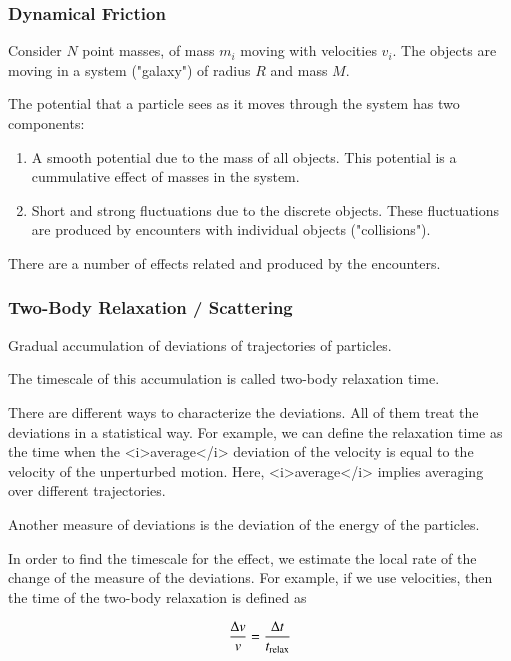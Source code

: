 \subsubsection{Dynamical Friction}

Consider $N$ point masses, of mass $m_i$ moving with velocities $v_i$. The objects are moving in a system ("galaxy") of radius $R$ and mass $M$. 

The potential that a particle sees as it moves through the system has two components: 

\begin{enumerate}
\item A smooth potential due to the mass of all objects. This potential is a cummulative effect of masses in the system. 
\item Short and strong fluctuations due to the discrete objects. These fluctuations are produced by encounters with individual objects ("collisions").  
\end{enumerate}

There are a number of effects related and produced by the encounters. 

\subsubsection{Two-Body Relaxation / Scattering}

Gradual accumulation of deviations of trajectories of particles. 


The timescale of this accumulation is called two-body relaxation time. 

There are different ways to characterize the deviations. All of them treat the deviations in a statistical way. For example, we can define the relaxation time as the time when the <i>average</i> deviation of the velocity is equal to the velocity of the unperturbed motion. Here, <i>average</i> implies averaging over different trajectories. 

Another measure of deviations is the deviation of the energy of the particles. 

In order to find the timescale for the effect, we estimate the local rate of the change of the measure of the deviations. For example, if we use velocities, then the time of the two-body relaxation is defined 
as 

\begin{equation}
\frac{\Delta v}{v} = \frac{\Delta t}{t_{\rm relax}}
\end{equation}

